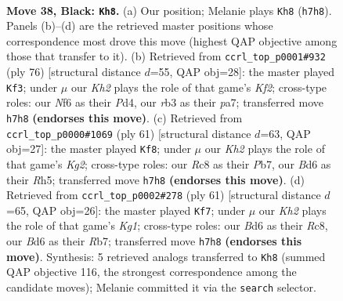 \documentclass[11pt]{article}
\begin{document}
\clearpage

\begin{figure}[p]\centering
\begin{subfigure}{0.46\textwidth}\centering
\resizebox{\linewidth}{!}{%
\newchessgame
\chessboard[
  setfen={2r5/p5pk/P1bb1n1p/1p3p2/1P3P2/1R2P1P1/8/RNB3K1 b - - 6 38},
  showmover=false,
  pgfstyle=straightmove, color=movearrow, markmove={h7-h8}
]}
\caption{}
\end{subfigure}\hfill
\begin{subfigure}{0.46\textwidth}\centering
\resizebox{\linewidth}{!}{%
\newchessgame
\chessboard[
  setfen={1br5/pp3rk1/6p1/5p1p/PB1P1P2/3BP3/5KPP/1R6 w - - 0 39},
  showmover=false,
  pgfstyle=straightmove, color=movearrow, markmove={f2-f3}
]}
\caption{}
\end{subfigure}
\\[4pt]
\begin{subfigure}{0.46\textwidth}\centering
\resizebox{\linewidth}{!}{%
\newchessgame
\chessboard[
  setfen={8/1p3pk1/2b1n1p1/p6r/2P5/PP3P2/5R1P/2K1NB2 b - - 0 31},
  showmover=false,
  pgfstyle=straightmove, color=movearrow, markmove={g7-f8}
]}
\caption{}
\end{subfigure}\hfill
\begin{subfigure}{0.46\textwidth}\centering
\resizebox{\linewidth}{!}{%
\newchessgame
\chessboard[
  setfen={2r3k1/1r4p1/3p3p/3Ppb2/5p2/1P3P2/R1PR2PP/4B1K1 b - - 0 31},
  showmover=false,
  pgfstyle=straightmove, color=movearrow, markmove={g8-f7}
]}
\caption{}
\end{subfigure}
\caption{\textbf{Move 38, Black: \texttt{Kh8}.} (a) Our position; Melanie plays \texttt{Kh8} (\texttt{h7h8}). Panels (b)--(d) are the retrieved master positions whose correspondence most drove this move (highest QAP objective among those that transfer to it). (b) Retrieved from \texttt{ccrl\_top\_p0001\#932} (ply 76) [structural distance $d$=55, QAP obj=28]: the master played \texttt{Kf3}; under $\mu$ our \emph{Kh2} plays the role of that game's \emph{Kf2}; cross-type roles: our \emph{N}f6 as their \emph{P}d4, our \emph{r}b3 as their \emph{p}a7; transferred move \texttt{h7h8} \textbf{(endorses this move)}. (c) Retrieved from \texttt{ccrl\_top\_p0000\#1069} (ply 61) [structural distance $d$=63, QAP obj=27]: the master played \texttt{Kf8}; under $\mu$ our \emph{Kh2} plays the role of that game's \emph{Kg2}; cross-type roles: our \emph{R}c8 as their \emph{P}b7, our \emph{B}d6 as their \emph{R}h5; transferred move \texttt{h7h8} \textbf{(endorses this move)}. (d) Retrieved from \texttt{ccrl\_top\_p0002\#278} (ply 61) [structural distance $d$=65, QAP obj=26]: the master played \texttt{Kf7}; under $\mu$ our \emph{Kh2} plays the role of that game's \emph{Kg1}; cross-type roles: our \emph{B}d6 as their \emph{R}c8, our \emph{B}d6 as their \emph{R}b7; transferred move \texttt{h7h8} \textbf{(endorses this move)}. Synthesis: 5 retrieved analogs transferred to \texttt{Kh8} (summed QAP objective 116, the strongest correspondence among the candidate moves); Melanie committed it via the \texttt{search} selector.}
\label{fig:thought-m75}
\end{figure}
\end{document}
